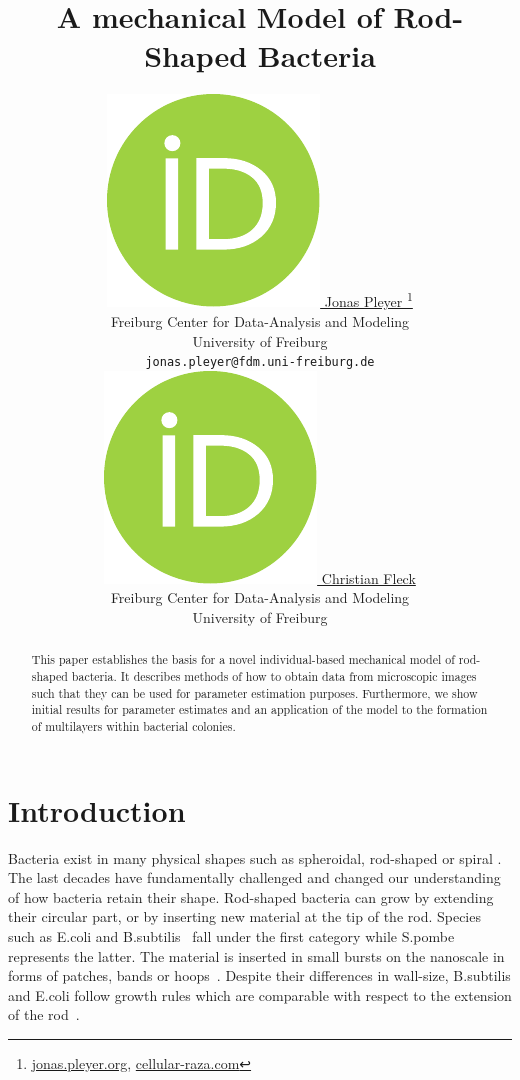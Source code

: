 \documentclass{article}
\title{A mechanical Model of Rod-Shaped Bacteria}
\author{
    \href{https://orcid.org/0009-0001-0613-7978}{
        \includegraphics[scale=0.06]{orcid.pdf}
        \hspace{1mm}Jonas Pleyer
    }
    \thanks{
        \href{https://jonas.pleyer.org}{jonas.pleyer.org},
        \href{https://cellular-raza.com}{cellular-raza.com}
    }\\
	Freiburg Center for Data-Analysis and Modeling\\
	University of Freiburg\\
	\texttt{jonas.pleyer@fdm.uni-freiburg.de} \\
	\And
	\href{https://orcid.org/0000-0002-6371-4495}{
        \includegraphics[scale=0.06]{orcid.pdf}
        \hspace{1mm}Christian Fleck
    }\\
	Freiburg Center for Data-Analysis and Modeling\\
	University of Freiburg
}
\begin{document}
\maketitle

\begin{abstract}
    This paper establishes the basis for a novel individual-based mechanical model of rod-shaped
    bacteria.
    It describes methods of how to obtain data from microscopic images such that they can be used
    for parameter estimation purposes.
    Furthermore, we show initial results for parameter estimates and an application of the model to
    the formation of multilayers within bacterial colonies.
\end{abstract}


\section{Introduction}
\label{section:introduction}

Bacteria exist in many physical shapes such as spheroidal, rod-shaped or spiral
\cite{Zapun2008,Young2006}.
The last decades have fundamentally challenged and changed our understanding of how bacteria retain
their shape.
Rod-shaped bacteria can grow by extending their circular part, or by inserting new material at the
tip of the rod.
Species such as E.coli and B.subtilis~\cite{Errington2020} fall under the first category while
S.pombe represents the latter.
The material is inserted in small bursts on the nanoscale in forms of patches, bands or
hoops~\cite{DePedro2003}.
Despite their differences in wall-size, B.subtilis and E.coli follow growth rules which are
comparable with respect to the extension of the rod~\cite{Chang2014}.
\end{document}
